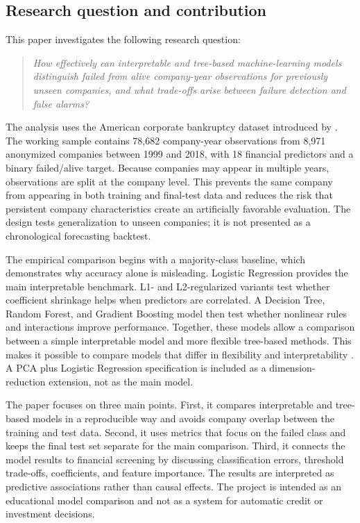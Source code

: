 \documentclass[11pt,a4paper]{article}
\begin{document}
\subsection{Research question and contribution}

This paper investigates the following research question:

\begin{quote}
\emph{How effectively can interpretable and tree-based machine-learning models
distinguish failed from alive company-year observations for previously unseen
companies, and what trade-offs arise between failure detection and false
alarms?}
\end{quote}

The analysis uses the American corporate bankruptcy dataset introduced by
\citet{lombardo2022}. The working sample contains 78,682 company-year
observations from 8,971 anonymized companies between 1999 and 2018, with 18
financial predictors and a binary failed/alive target. Because companies may
appear in multiple years, observations are split at the company level. This
prevents the same company from appearing in both training and final-test data
and reduces the risk that persistent company characteristics create an
artificially favorable evaluation. The design tests generalization to unseen
companies; it is not presented as a chronological forecasting backtest.

The empirical comparison begins with a majority-class baseline, which
demonstrates why accuracy alone is misleading. Logistic Regression provides the
main interpretable benchmark. L1- and L2-regularized variants test whether
coefficient shrinkage helps when predictors are correlated. A Decision Tree,
Random Forest, and Gradient Boosting model then test whether nonlinear rules and
interactions improve performance. Together, these models allow a comparison
between a simple interpretable model and more flexible tree-based methods. This
makes it possible to compare models that differ in flexibility and
interpretability \citep{james2023}. A PCA plus Logistic Regression
specification is included as a dimension-reduction extension, not as the main
model.

The paper focuses on three main points. First, it compares interpretable and
tree-based models in a reproducible way and avoids company overlap between the
training and test data. Second, it uses metrics that focus on the failed class
and keeps the final test set separate for the main comparison. Third, it
connects the model results to financial screening by discussing classification
errors, threshold trade-offs, coefficients, and feature importance. The results
are interpreted as predictive associations rather than causal effects. The
project is intended as an educational model comparison and not as a system for
automatic credit or investment decisions.
\end{document}
